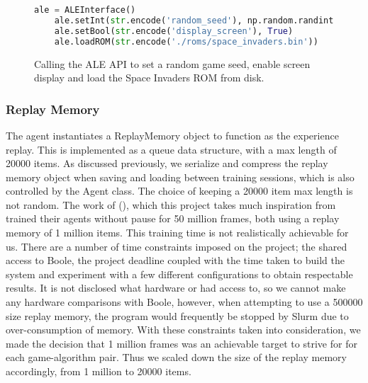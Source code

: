 \begin{figure}[h]
    \centering
    \begin{lstlisting}[language=Python]
    ale = ALEInterface()
    ale.setInt(str.encode('random_seed'), np.random.randint(100))
    ale.setBool(str.encode('display_screen'), True)
    ale.loadROM(str.encode('./roms/space_invaders.bin'))
    \end{lstlisting}
    \caption{Calling the ALE API to set a random game seed, enable screen display and load the Space Invaders ROM from disk.}
    \label{fig:aleflags}
\end{figure}

\subsubsection{Replay Memory} \label{sec:replaymem}
The agent instantiates a ReplayMemory object to function as the experience replay. This is implemented as a queue data structure, with a max length of 20000 items. As discussed previously, we serialize and compress the replay memory object when saving and loading between training sessions, which is also controlled by the Agent class. The choice of keeping a 20000 item max length is not random. The work of (\citet{deepmind1,human}), which this project takes much inspiration from trained their agents without pause for 50 million frames, both using a replay memory of 1 million items. This training time is not realistically achievable for us. There are a number of time constraints imposed on the project; the shared access to Boole, the project deadline coupled with the time taken to build the system and experiment with a few different configurations to obtain respectable results. It is not disclosed what hardware \citet{deepmind1} or \cite{human} had access to, so we cannot make any hardware comparisons with Boole, however, when attempting to use a 500000 size replay memory, the program would frequently be stopped by Slurm due to over-consumption of memory. With these constraints taken into consideration, we made the decision that 1 million frames was an achievable target to strive for for each game-algorithm pair. Thus we scaled down the size of the replay memory accordingly, from 1 million to 20000 items.

